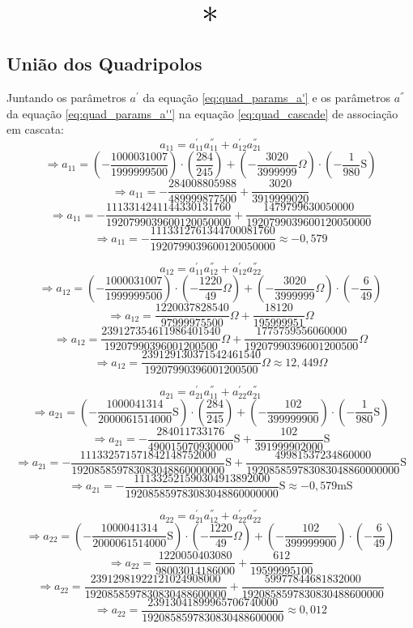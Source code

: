 \documentclass{report}
\begin{document}
\begin{center}
    \[ \scalebox{3}{$ * $} \]
\end{center}

\subsection{União dos Quadripolos}

Juntando os parâmetros $ a^{'} $ da equação \ref{eq:quad_params_a'} e os parâmetros $ a^{''} $ da equação \ref{eq:quad_params_a''} na equação \ref{eq:quad_cascade} de
associação em cascata:
$$ a_{11} = a^{'}_{11}a^{''}_{11} + a^{'}_{12}a^{''}_{21} $$
$$ \Rightarrow a_{11} = \left(- \frac{1000031007}{1999999500}\right) \cdot \left(\frac{284}{245}\right) + \left(- \frac{3020}{3999999} \Omega\right) \cdot \left(- \frac{1}{980}\text{S}\right) $$
$$ \Rightarrow a_{11} = - \frac{284008805988}{489999877500} + \frac{3020}{3919999020} $$
$$ \Rightarrow a_{11} = - \frac{1113314241144330131760}{1920799039600120050000} + \frac{1479799630050000}{1920799039600120050000} $$
$$ \Rightarrow a_{11} = - \frac{1113312761344700081760}{1920799039600120050000} \approx -0,\!579 $$

$$ a_{12} = a^{'}_{11}a^{''}_{12} + a^{'}_{12}a^{''}_{22} $$
$$ \Rightarrow a_{12} = \left(- \frac{1000031007}{1999999500}\right) \cdot \left(- \frac{1220}{49} \Omega\right) + \left(- \frac{3020}{3999999} \Omega\right) \cdot \left(- \frac{6}{49}\right) $$
$$ \Rightarrow a_{12} = \frac{1220037828540}{97999975500} \Omega + \frac{18120}{195999951} \Omega $$
$$ \Rightarrow a_{12} = \frac{239127354611986401540}{19207990396001200500} \Omega + \frac{1775759556060000}{19207990396001200500} \Omega $$
$$ \Rightarrow a_{12} = \frac{239129130371542461540}{19207990396001200500} \Omega \approx 12,\!449 \Omega $$

$$ a_{21} = a^{'}_{21}a^{''}_{11} + a^{'}_{22}a^{''}_{21} $$
$$ \Rightarrow a_{21} = \left(- \frac{1000041314}{2000061514000} \text{S}\right) \cdot \left(\frac{284}{245}\right) + \left(- \frac{102}{399999900}\right) \cdot \left(- \frac{1}{980}\text{S}\right) $$
$$ \Rightarrow a_{21} = - \frac{284011733176}{490015070930000} \text{S} + \frac{102}{391999902000}\text{S} $$
$$ \Rightarrow a_{21} = - \frac{111332571571842148752000}{192085859783083048860000000} \text{S} + \frac{49981537234860000}{192085859783083048860000000}\text{S} $$
$$ \Rightarrow a_{21} = - \frac{111332521590304913892000}{192085859783083048860000000} \text{S} \approx - 0,\!579 \text{mS} $$

$$ a_{22} = a^{'}_{21}a^{''}_{12} + a^{'}_{22}a^{''}_{22} $$
$$ \Rightarrow a_{22} = \left(- \frac{1000041314}{2000061514000} \text{S}\right) \cdot \left(- \frac{1220}{49} \Omega\right) + \left(- \frac{102}{399999900}\right) \cdot \left(- \frac{6}{49}\right) $$
$$ \Rightarrow a_{22} = \frac{1220050403080}{98003014186000} + \frac{612}{19599995100} $$
$$ \Rightarrow a_{22} = \frac{23912981922121024908000}{1920858597830830488600000} + \frac{59977844681832000}{1920858597830830488600000} $$
$$ \Rightarrow a_{22} = \frac{23913041899965706740000}{1920858597830830488600000} \approx 0,\!012 $$
\end{document}
